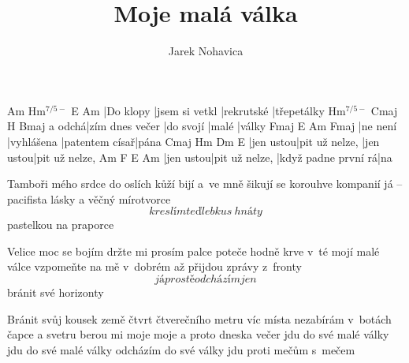 \documentclass{song}
\author{Jarek Nohavica}
\title{Moje malá válka}
\newcommand{\Hmaug}{Hm$^{7/5-}$}
\begin{document}
\strophe
Am        \Hmaug{}       E\7        Am
|Do klopy |jsem si vetkl |rekrutské |třepetálky
	   \Hmaug{}        Cmaj\7    H\7   Bmaj\7
a odchá|zím dnes večer |do svojí |malé |války
Fmaj\7   E\7        Am             Fmaj\7
|ne není |vyhlášena |patentem císař|pána
Cmaj\7    Hm\7           Dm\7      E\7
|jen ustou|pit už nelze, |jen ustou|pit už nelze,
Am        F\7            E\7                 Am
|jen ustou|pit už nelze, |když padne první rá|na
\endstrophe

\strophe*
Tamboři mého srdce do oslích kůží bijí
a~ve mně šikují se korouhve kompanií
já -- pacifista lásky a věčný mírotvorce
\[ kreslím teď lebku s~hnáty \] pastelkou na praporce
\endstrophe

\strophe*
Velice moc se bojím držte mi prosím palce
poteče hodně krve v~té mojí malé válce
vzpomeňte na mě v~dobrém až přijdou zprávy z~fronty
\[ já prostě odcházím jen \] bránit své horizonty
\endstrophe

\strophe*
Bránit svůj kousek země čtvrt čtverečního metru
víc místa nezabírám v~botách čapce a svetru
berou mi moje moje a proto dneska večer
jdu do své malé války jdu do své malé války
odcházím do své války jdu proti mečům s~mečem
\endstrophe

\end{document}
